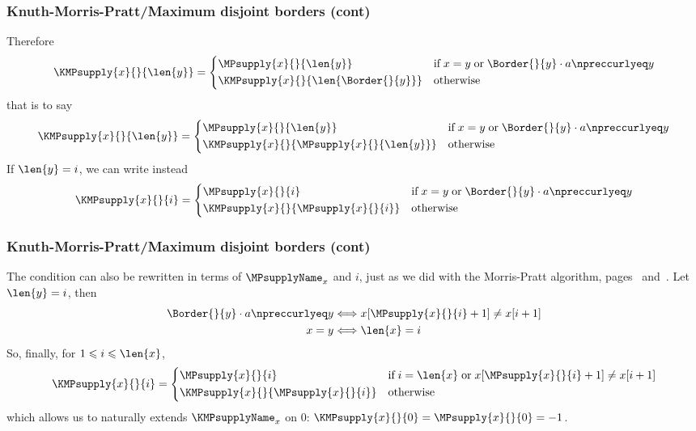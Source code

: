 %
\begin{frame}
\frametitle{Knuth-Morris-Pratt/Maximum disjoint borders (cont)}

Therefore
\[
  \KMPsupply{x}{}{\len{y}}
= \left\lbrace
  \begin{aligned}
    &  \MPsupply{x}{}{\len{y}}
    && \text{if} \; x = y \; \text{or} 
       \; \Border{}{y} \cdot a \npreccurlyeq y\\
    &  \KMPsupply{x}{}{\len{\Border{}{y}}}
    && \text{otherwise}
  \end{aligned}
  \right.
\]
that is to say
\[
  \KMPsupply{x}{}{\len{y}}
= \left\lbrace
  \begin{aligned}
    &  \MPsupply{x}{}{\len{y}}
    && \text{if} \; x = y \; \text{or} 
       \; \Border{}{y} \cdot a \npreccurlyeq y\\
    &  \KMPsupply{x}{}{\MPsupply{x}{}{\len{y}}}
    && \text{otherwise}
  \end{aligned}
  \right.
\]
If \(\len{y} = i\), we can write instead
\[
  \KMPsupply{x}{}{i}
= \left\lbrace
  \begin{aligned}
    &  \MPsupply{x}{}{i}
    && \text{if} \; x = y \; \text{or} 
       \; \Border{}{y} \cdot a \npreccurlyeq y\\
    &  \KMPsupply{x}{}{\MPsupply{x}{}{i}}
    && \text{otherwise}
  \end{aligned}
  \right.
\]

\end{frame}

%
\begin{frame}
\frametitle{Knuth-Morris-Pratt/Maximum disjoint borders (cont)}

\label{gamma_ref_def}

The condition can also be rewritten in terms of \(\MPsupplyName_{x}\)
and \(i\), just as we did with the Morris-Pratt algorithm,
pages~\pageref{condition} and~\pageref{morris-pratt-conf}. Let
\(\len{y} = i\), then
\begin{align*}
  \Border{}{y} \cdot a \npreccurlyeq y
& \Longleftrightarrow x [\MPsupply{x}{}{i} + 1] \neq x [i + 1]\\
  x = y
& \Longleftrightarrow \len{x} = i
\end{align*}
So, finally, for \(1 \leqslant i \leqslant \len{x}\),
\[
  \KMPsupply{x}{}{i}
= \left\lbrace
  \begin{aligned}
    &  \MPsupply{x}{}{i}
    && \text{if} \; i = \len{x} \; \text{or} 
       \; x [\MPsupply{x}{}{i} + 1] \neq x [i + 1]\\
    &  \KMPsupply{x}{}{\MPsupply{x}{}{i}}
    && \text{otherwise}
  \end{aligned}
  \right.
\]
which allows us to naturally extends \(\KMPsupplyName_{x}\) on \(0\): 
\(\KMPsupply{x}{}{0} = \MPsupply{x}{}{0} = -1\).

\end{frame}

